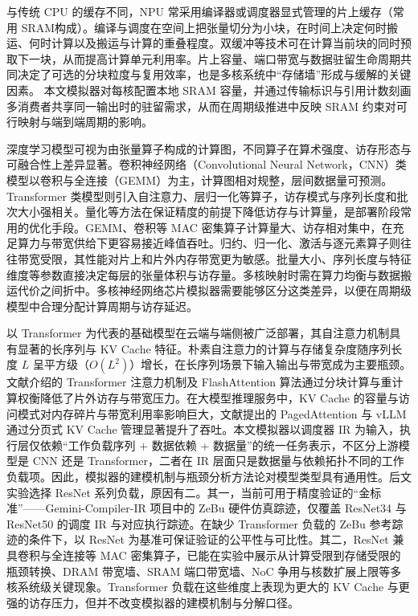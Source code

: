 与传统 CPU 的缓存不同，NPU 常采用编译器或调度器显式管理的片上缓存（常用 SRAM构成）。编译与调度在空间上把张量切分为小块，在时间上决定何时搬运、何时计算以及搬运与计算的重叠程度。双缓冲等技术可在计算当前块的同时预取下一块，从而提高计算单元利用率。片上容量、端口带宽与数据驻留生命周期共同决定了可选的分块粒度与复用效率，也是多核系统中“存储墙”形成与缓解的关键因素\cite{gholami2024aimemorywall}。 本文模拟器对每核配置本地 SRAM 容量，并通过传输标识与引用计数刻画多消费者共享同一输出时的驻留需求，从而在周期级推进中反映 SRAM 约束对可行映射与端到端周期的影响。



深度学习模型可视为由张量算子构成的计算图，不同算子在算术强度、访存形态与可融合性上差异显著。卷积神经网络（Convolutional Neural Network，CNN）类模型以卷积与全连接（GEMM）为主，计算图相对规整，层间数据量可预测。Transformer 类模型则引入自注意力、层归一化等算子，访存模式与序列长度和批次大小强相关。量化等方法在保证精度的前提下降低访存与计算量，是部署阶段常用的优化手段\cite{ding2020survey}。GEMM、卷积等 MAC 密集算子计算量大、访存相对集中，在充足算力与带宽供给下更容易接近峰值吞吐。归约、归一化、激活与逐元素算子则往往带宽受限，其性能对片上和片外内存带宽更为敏感。批量大小、序列长度与特征维度等参数直接决定每层的张量体积与访存量。多核映射时需在算力均衡与数据搬运代价之间折中。多核神经网络芯片模拟器需要能够区分这类差异，以便在周期级模型中合理分配计算周期与访存延迟。


以 Transformer 为代表的基础模型在云端与端侧被广泛部署，其自注意力机制具有显著的长序列与 KV Cache 特征。朴素自注意力的计算与存储复杂度随序列长度 $L$ 呈平方级（$O(L^2)$）增长，在长序列场景下输入输出与带宽成为主要瓶颈。文献\parencite{vaswani2017attention,dao2022flashattention,dao2023flashattention2}介绍的 Transformer 注意力机制及 FlashAttention 算法通过分块计算与重计算权衡降低了片外访存与带宽压力。在大模型推理服务中，KV Cache 的容量与访问模式对内存碎片与带宽利用率影响巨大，文献\parencite{kwon2023pagedattention}提出的 PagedAttention 与 vLLM 通过分页式 KV Cache 管理显著提升了吞吐。本文模拟器以调度器 IR 为输入，执行层仅依赖“工作负载序列 + 数据依赖 + 数据量”的统一任务表示，不区分上游模型是 CNN 还是 Transformer，二者在 IR 层面只是数据量与依赖拓扑不同的工作负载项。因此，模拟器的建模机制与瓶颈分析方法论对模型类型具有通用性。后文实验选择 ResNet 系列负载，原因有二。其一，当前可用于精度验证的“金标准”——Gemini-Compiler-IR 项目中的 ZeBu 硬件仿真踪迹，仅覆盖 ResNet34 与 ResNet50 的调度 IR 与对应执行踪迹。在缺少 Transformer 负载的 ZeBu 参考踪迹的条件下，以 ResNet 为基准可保证验证的公平性与可比性。其二，ResNet 兼具卷积与全连接等 MAC 密集算子，已能在实验中展示从计算受限到存储受限的瓶颈转换、DRAM 带宽墙、SRAM 端口带宽墙、NoC 争用与核数扩展上限等多核系统级关键现象。Transformer 负载在这些维度上表现为更大的 KV Cache 与更强的访存压力，但并不改变模拟器的建模机制与分解口径。

